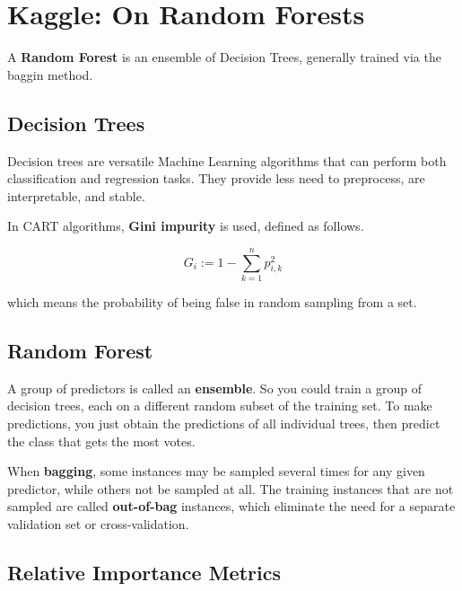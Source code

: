 \documentclass[12pt]{article}
\begin{document}
\pagebreak
\section*{Kaggle: On Random Forests}

A \textbf{Random Forest} is an ensemble of Decision Trees, generally trained via the baggin method.

\setcounter{section}{1}
\setcounter{subsection}{0}

\subsection{Decision Trees}

Decision trees are versatile Machine Learning algorithms that can perform both classification and regression tasks. They provide less need to preprocess, are interpretable, and stable.

In CART algorithms, \textbf{Gini impurity} is used, defined as follows.

$$
G_i := 1 - \sum_{k=1}^n p_{i, k}^2
$$

which means the probability of being false in random sampling from a set. 


\subsection{Random Forest}

A group of predictors is called an \textbf{ensemble}. So you could train a group of decision trees, each on a different random subset of the training set. To make predictions, you just obtain the predictions of all individual trees, then predict the class that gets the most votes.

When \textbf{bagging}, some instances may be sampled several times for any given predictor, while others not be sampled at all. The training instances that are not sampled are called \textbf{out-of-bag} instances, which eliminate the need for a separate validation set or cross-validation. 


\subsection{Relative Importance Metrics}
\end{document}
